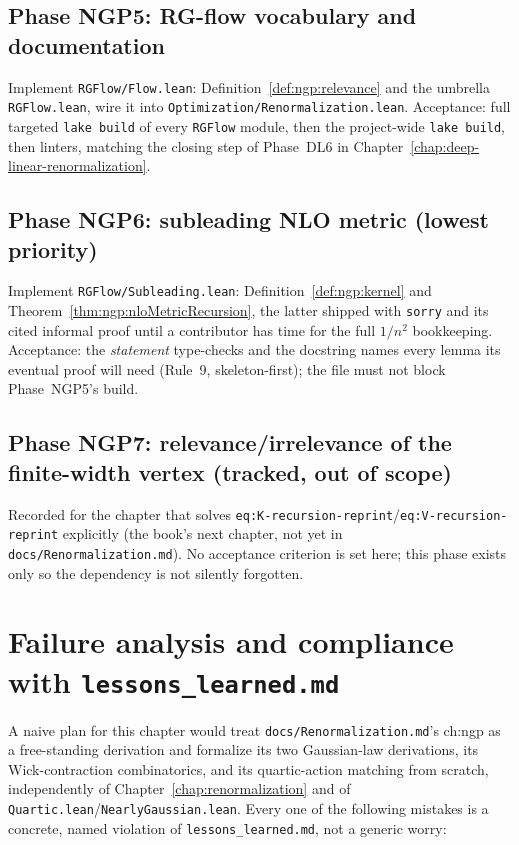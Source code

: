 \subsection*{Phase NGP5: RG-flow vocabulary and documentation}
Implement \texttt{RGFlow/Flow.lean}: Definition~\ref{def:ngp:relevance} and the umbrella
\texttt{RGFlow.lean}, wire it into \texttt{Optimization/Renormalization.lean}. Acceptance: full
targeted \texttt{lake build} of every \texttt{RGFlow} module, then the project-wide
\texttt{lake build}, then linters, matching the closing step of
Phase~DL6 in Chapter~\ref{chap:deep-linear-renormalization}.

\subsection*{Phase NGP6: subleading NLO metric (lowest priority)}
Implement \texttt{RGFlow/Subleading.lean}: Definition~\ref{def:ngp:kernel} and
Theorem~\ref{thm:ngp:nloMetricRecursion}, the latter shipped with \texttt{sorry} and its cited
informal proof until a contributor has time for the full $1/n^2$ bookkeeping. Acceptance: the
\emph{statement} type-checks and the docstring names every lemma its eventual proof will need
(Rule~9, skeleton-first); the file must not block Phase~NGP5's build.

\subsection*{Phase NGP7: relevance/irrelevance of the finite-width vertex (tracked, out of scope)}
Recorded for the chapter that solves \texttt{eq:K-recursion-reprint}/\texttt{eq:V-recursion-reprint}
explicitly (the book's next chapter, not yet in \texttt{docs/Renormalization.md}). No acceptance
criterion is set here; this phase exists only so the dependency is not silently forgotten.

\section{Failure analysis and compliance with \texttt{lessons\_learned.md}}
\label{sec:ngp:compliance}

A naive plan for this chapter would treat \texttt{docs/Renormalization.md}'s ch:ngp as a
free-standing derivation and formalize its two Gaussian-law derivations, its Wick-contraction
combinatorics, and its quartic-action matching from scratch, independently of
Chapter~\ref{chap:renormalization} and of \texttt{Quartic.lean}/\texttt{NearlyGaussian.lean}. Every
one of the following mistakes is a concrete, named violation of \texttt{lessons\_learned.md}, not a
generic worry:

